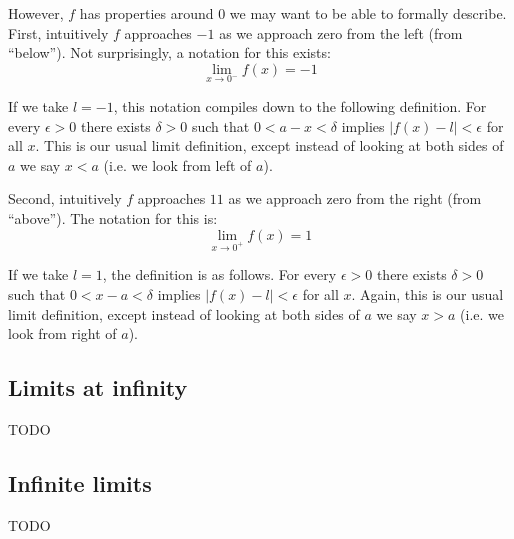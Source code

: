 However, $f$ has properties around $0$ we may want to be able to
formally describe. First, intuitively $f$ approaches $-1$ as we
approach zero from the left (from ``below''). Not surprisingly, a
notation for this exists:
\[\lim_{x\to0^-}f(x)=-1\]

If we take $l=-1$, this notation compiles down to the following
definition. For every $\epsilon>0$ there exists $\delta>0$ such that
$0<a-x<\delta$ implies $|f(x)-l|<\epsilon$ for all $x$. This is our usual limit
definition, except instead of looking at both sides of $a$ we say
$x<a$ (i.e. we look from left of $a$).

\vs

Second, intuitively $f$ approaches $11$ as we approach zero from the
right (from ``above''). The notation for this is:
\[\lim_{x\to0^+}f(x)=1\]

If we take $l=1$, the definition is as follows. For every $\epsilon>0$ there
exists $\delta>0$ such that $0<x-a<\delta$ implies $|f(x)-l|<\epsilon$ for all
$x$. Again, this is our usual limit definition, except instead of
looking at both sides of $a$ we say $x>a$ (i.e. we look from right of
$a$).

\subsection{Limits at infinity}
TODO

\subsection{Infinite limits}
TODO

